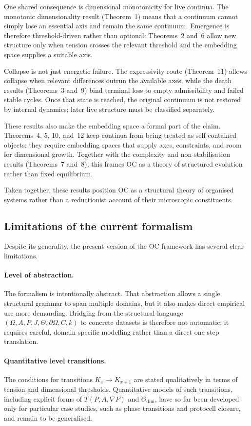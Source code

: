 One shared consequence is dimensional monotonicity for live continua. The
monotonic dimensionality result (Theorem~1) means that a
continuum cannot simply lose an essential axis and remain the same continuum.
Emergence is therefore threshold-driven rather than optional: Theorems~2 and~6
allow new structure only when tension crosses the relevant threshold and the
embedding space supplies a suitable axis.

Collapse is not just energetic failure. The
expressivity route (Theorem~11) allows collapse when relevant differences
outrun the available axes, while the death results (Theorems~3 and~9) bind
terminal loss to empty admissibility and failed stable cycles. Once that state
is reached, the original continuum is not restored by internal dynamics; later
live structure must be classified separately.

These results also make the embedding space a formal part of the
claim. Theorems~4, 5, 10, and~12 keep continua from being treated as
self-contained objects: they require embedding spaces that supply axes,
constraints, and room for dimensional growth. Together with the complexity and
non-stabilisation results (Theorems~7 and~8), this frames OC as a theory of
structured evolution rather than fixed equilibrium.

Taken together, these results position OC as a structural theory of organised systems rather than a reductionist account of their microscopic constituents.

\subsection{Limitations of the current formalism}

Despite its generality, the present version of the OC framework has several clear limitations.

\paragraph{Level of abstraction.}
The formalism is intentionally abstract. That abstraction allows a single structural grammar to span
multiple domains, but it also makes direct empirical use more demanding. Bridging from the
structural language \((\Omega,A,P,J,\Theta,\partial\Omega,C,k)\) to concrete datasets is therefore
not automatic; it requires careful, domain-specific modelling rather than a direct one-step
translation.

\paragraph{Quantitative level transitions.}
The conditions for transitions \(K_x \to K_{x+1}\) are stated qualitatively in terms of tension and dimensional thresholds.
Quantitative models of such transitions, including explicit forms of \(T(P,A,\nabla P)\) and \(\Theta_{\mathrm{dim}}\), have so far been developed only for particular case studies, such as phase transitions and protocell closure, and remain to be generalised.

